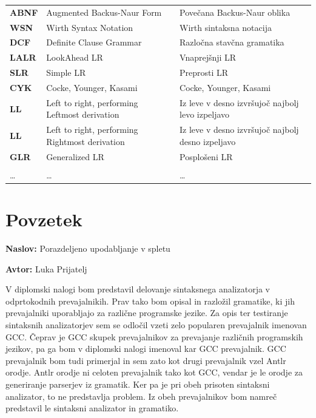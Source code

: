 \documentclass[a4paper, 12pt, tikz, border=5]{book}
\newcommand{\ttitle}{Porazdeljeno upodabljanje v spletu}
\newcommand{\tauthor}{Luka Prijatelj}
\newcommand{\clearemptydoublepage}{\newpage{\pagestyle{empty}\cleardoublepage}}
\begin{document}
\begin{tabular}{p{}|p{}|p{}}
  {\bf ABNF} & Augmented Backus-Naur Form & Povečana Backus-Naur oblika \\
  {\bf WSN} & Wirth Syntax Notation & Wirth sintaksna notacija \\
  {\bf DCF} & Definite Clause Grammar & Razločna stavčna gramatika \\
  {\bf LALR} & LookAhead LR & Vnaprejšnji LR \\
  {\bf SLR} & Simple LR & Preprosti LR \\
  {\bf CYK} & Cocke, Younger, Kasami & Cocke, Younger, Kasami \\
  {\bf LL} & Left to right, performing Leftmost derivation & Iz leve v desno izvršujoč najbolj levo izpeljavo \\
  {\bf LL} & Left to right, performing Rightmost derivation & Iz leve v desno izvršujoč najbolj desno izpeljavo \\
  {\bf GLR} & Generalized LR & Posplošeni LR \\ \\
  \dots & \dots & \dots \\
\end{tabular}


\clearemptydoublepage


\chapter*{Povzetek}

\noindent\textbf{Naslov:} \ttitle
\bigskip

\noindent\textbf{Avtor:} \tauthor
\bigskip

\noindent V diplomski nalogi bom predstavil delovanje sintaksnega analizatorja v odprtokodnih prevajalnikih. Prav tako bom opisal in razložil gramatike, ki jih prevajalniki uporabljajo za različne programske jezike. Za opis ter testiranje sintaksnih analizatorjev sem se odločil vzeti zelo popularen prevajalnik imenovan GCC. Čeprav je GCC skupek prevajalnikov za prevajanje različnih programskih jezikov, pa ga bom v diplomski nalogi imenoval kar GCC prevajalnik. 
GCC prevajalnik bom tudi primerjal in sem zato kot drugi prevajalnik vzel Antlr orodje. Antlr orodje ni celoten prevajalnik tako kot GCC, vendar je le orodje za generiranje parserjev iz gramatik. Ker pa je pri obeh prisoten sintaksni analizator, to ne predstavlja problem. Iz obeh prevajalnikov bom namreč predstavil le sintaksni analizator in gramatiko. 
\end{document}
